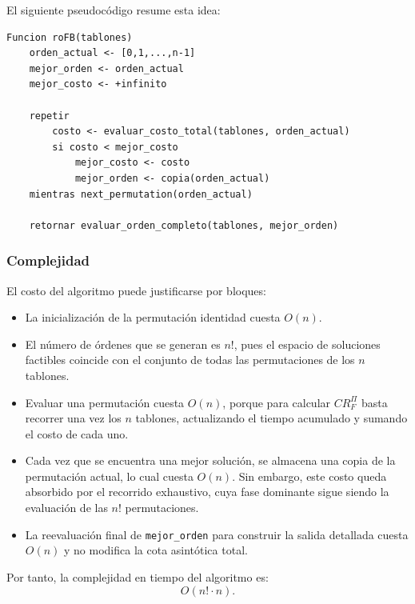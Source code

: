 \documentclass[12pt,a4paper]{article}
\begin{document}
El siguiente pseudoc\'odigo resume esta idea:

\begin{center}
\begin{minipage}{0.9\textwidth}
\begin{lstlisting}[mathescape=true,basicstyle=\ttfamily\small]
Funcion roFB(tablones)
    orden_actual <- [0,1,...,n-1]
    mejor_orden <- orden_actual
    mejor_costo <- +infinito

    repetir
        costo <- evaluar_costo_total(tablones, orden_actual)
        si costo < mejor_costo
            mejor_costo <- costo
            mejor_orden <- copia(orden_actual)
    mientras next_permutation(orden_actual)

    retornar evaluar_orden_completo(tablones, mejor_orden)
\end{lstlisting}
\end{minipage}
\end{center}

\subsubsection{Complejidad}

El costo del algoritmo puede justificarse por bloques:
\begin{itemize}
  \item La inicializaci\'on de la permutaci\'on identidad cuesta \(O(n)\).
  \item El n\'umero de \'ordenes que se generan es \(n!\), pues el espacio de soluciones factibles coincide con el conjunto de todas las permutaciones de los \(n\) tablones.
  \item Evaluar una permutaci\'on cuesta \(O(n)\), porque para calcular \(CR_F^\Pi\) basta recorrer una vez los \(n\) tablones, actualizando el tiempo acumulado y sumando el costo de cada uno.
  \item Cada vez que se encuentra una mejor soluci\'on, se almacena una copia de la permutaci\'on actual, lo cual cuesta \(O(n)\). Sin embargo, este costo queda absorbido por el recorrido exhaustivo, cuya fase dominante sigue siendo la evaluaci\'on de las \(n!\) permutaciones.
  \item La reevaluaci\'on final de \texttt{mejor\_orden} para construir la salida detallada cuesta \(O(n)\) y no modifica la cota asint\'otica total.
\end{itemize}

Por tanto, la complejidad en tiempo del algoritmo es:
\[
O(n! \cdot n).
\]
\end{document}
